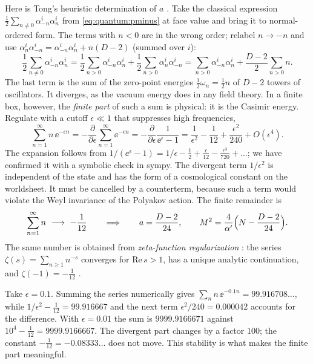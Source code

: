 Here is Tong's heuristic determination of $a$ . Take the
classical expression $\frac12\sum_{n\neq0}\alpha^i_{-n}\alpha^i_n$ from
\cref{eq:quantum:pminus} at face value and bring it to normal-ordered form. The terms with
$n<0$ are in the wrong order; relabel $n\to-n$ and use
$\alpha^i_n\alpha^i_{-n}=\alpha^i_{-n}\alpha^i_n+n(D-2)$ (summed over $i$):
\begin{equation}\label{eq:quantum:ordering}
 \frac12\sum_{n\neq0}\alpha^i_{-n}\alpha^i_n
  =\frac12\sum_{n>0}\alpha^i_{-n}\alpha^i_n+\frac12\sum_{n>0}\alpha^i_{n}\alpha^i_{-n}
  =\sum_{n>0}\alpha^i_{-n}\alpha^i_n+\frac{D-2}{2}\sum_{n>0}n .
\end{equation}
The last term is the sum of the zero-point energies $\frac12\omega_n=\frac12n$ of $D-2$ towers
of oscillators. It diverges, as the vacuum energy does in any field theory. In a finite
box, however, the \emph{finite part} of such a sum is physical: it is the Casimir
energy. Regulate with a cutoff $\epsilon\ll1$ that suppresses high
frequencies,
\begin{equation}\label{eq:quantum:cutoff}
 \sum_{n=1}^\infty n\,\ee^{-\epsilon n}
 =-\frac{\partial}{\partial\epsilon}\sum_{n=1}^\infty\ee^{-\epsilon n}
 =-\frac{\partial}{\partial\epsilon}\frac{1}{\ee^{\epsilon}-1}
 =\frac{1}{\epsilon^2}-\frac1{12}+\frac{\epsilon^2}{240}+O(\epsilon^4).
\end{equation}
The expansion follows from $1/(\ee^\epsilon-1)=1/\epsilon-\frac12+\frac{\epsilon}{12}
-\frac{\epsilon^3}{720}+\dots$; we have confirmed it with a symbolic check in sympy. The
divergent term $1/\epsilon^2$ is independent of the state and has the form of a
cosmological constant on the worldsheet. It must be cancelled by a counterterm, because such
a term would violate the Weyl invariance of the Polyakov action. The finite remainder is
\begin{equation}\label{eq:quantum:zeta}
 \sum_{n=1}^\infty n\ \longrightarrow\ -\frac1{12}
 \qquad\Longrightarrow\qquad a=\frac{D-2}{24},\qquad
 M^2=\frac4{\alpha'}\Big(N-\frac{D-2}{24}\Big).
\end{equation}
The same number is obtained from \emph{zeta-function regularization}%
: the series $\zeta(s)=\sum_{n\ge1}n^{-s}$ converges for
$\mathrm{Re}\,s>1$, has a unique analytic continuation, and $\zeta(-1)=-\frac1{12}$
.

\begin{example}\label{ex:quantum:casimir}
Take $\epsilon=0.1$. Summing the series numerically gives
$\sum_nn\,\ee^{-0.1n}=99.916708\dots$, while $1/\epsilon^2-\frac1{12}=99.916667$ and the next
term $\epsilon^2/240=0.000042$ accounts for the difference. With $\epsilon=0.01$ the sum is
$9999.9166671$ against $10^4-\frac1{12}=9999.9166667$. The divergent part changes by a factor
$100$; the constant $-\frac1{12}=-0.08333\dots$ does not move. This stability is what makes
the finite part meaningful.
\end{example}

